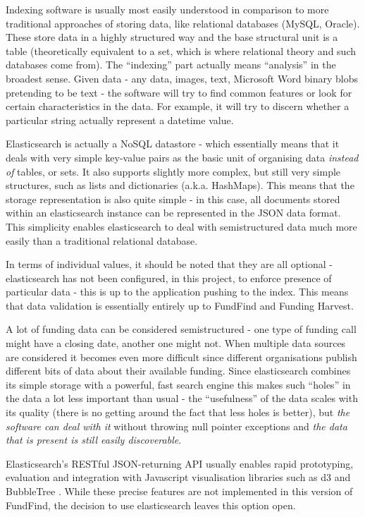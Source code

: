 Indexing software is usually most easily understood in comparison to more traditional approaches of storing data, like relational databases (MySQL, Oracle). These store data in a highly structured way and the base structural unit is a table (theoretically equivalent to a set, which is where relational theory and such databases come from). The ``indexing'' part actually means ``analysis'' in the broadest sense. Given data - any data, images, text, Microsoft Word binary blobs pretending to be text - the software will try to find common features or look for certain characteristics in the data. For example, it will try to discern whether a particular string actually represent a datetime value.
 
 Elasticsearch is actually a NoSQL datastore - which essentially means that it deals with very simple key-value pairs as the basic unit of organising data \emph{instead of} tables, or sets. It also supports slightly more complex, but still very simple structures, such as lists and dictionaries (a.k.a. HashMaps). This means that the storage representation is also quite simple - in this case, all documents stored within an elasticsearch instance can be represented in the JSON data format. This simplicity enables elasticsearch to deal with semistructured data much more easily than a traditional relational database.
 
 In terms of individual values, it should be noted that they are all optional - elasticsearch has not been configured, in this project, to enforce presence of particular data - this is up to the application pushing to the index. This means that data validation is essentially entirely up to FundFind and Funding Harvest.
 
 A lot of funding data can be considered semistructured - one type of funding call might have a closing date, another one might not. When multiple data sources are considered it becomes even more difficult since different organisations publish different bits of data about their available funding. Since elasticsearch combines its simple storage with a powerful, fast search engine this makes such ``holes'' in the data a lot less important than usual - the ``usefulness'' of the data scales with its quality (there is no getting around the fact that less holes is better), but \emph{the software can deal with it} without throwing null pointer exceptions and \emph{the data that is present is still easily discoverable}.
 
 Elasticsearch's RESTful JSON-returning API usually enables rapid prototyping, evaluation and integration with Javascript visualisation libraries such as d3 \cite{d3} and BubbleTree \cite{bubbletree}. While these precise features are not implemented in this version of FundFind, the decision to use elasticsearch leaves this option open.
 
